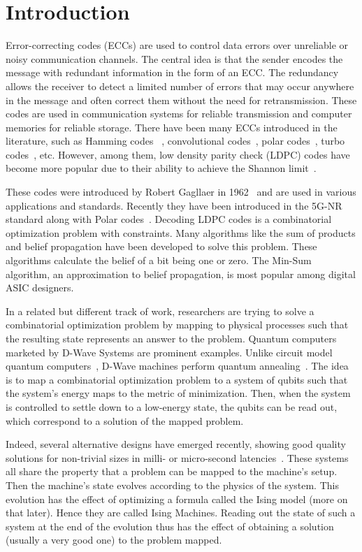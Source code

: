 \section{Introduction}

Error-correcting codes (ECCs) are used to control data errors over unreliable or noisy communication channels. The central idea is that the sender encodes the message with redundant information in the form of an ECC. The redundancy allows the receiver to detect a limited number of errors that may occur anywhere in the message and often correct them without the need for retransmission. These codes are used in communication systems for reliable transmission and computer memories for reliable storage. There have been many ECCs introduced in the literature, such as Hamming codes ~\cite{hamming1950error}, convolutional codes~\cite{viterbi1971convolutional}, polar codes~\cite{arikan2008performance}, turbo codes~\cite{berrou1993near}, etc. However, among them, low density parity check (LDPC) codes have become more popular due to their ability to achieve the Shannon limit~\cite{mackay1999good}. 

These codes were introduced by Robert Gagllaer in 1962~\cite{gallager1962low} and are used in various applications and standards. Recently they have been introduced in the 5G-NR standard along with Polar codes~\cite{bae2019overview}. Decoding LDPC codes is a combinatorial optimization problem with constraints. Many algorithms like the sum of products and belief propagation have been developed to solve this problem. These algorithms calculate the belief of a bit being one or zero. The Min-Sum algorithm, an approximation to belief propagation, is most popular among digital ASIC designers.

In a related but different track of work, researchers are trying to solve a combinatorial optimization problem by mapping to physical processes such that the resulting state represents an answer to the problem. Quantum computers marketed by D-Wave Systems are prominent examples. Unlike circuit model quantum computers~\cite{google_quantum,pednault2019leveraging}, D-Wave machines perform quantum annealing~\cite{bunyk_2014_tas}. The idea is to map a combinatorial optimization problem to a system of qubits such that the system's energy maps to the metric of minimization. Then, when the system is controlled to settle down to a low-energy state, the qubits can be read out, which correspond to a solution of the mapped problem.

Indeed, several alternative designs have emerged recently, showing good quality solutions for non-trivial sizes in milli- or micro-second latencies~\cite{inagaki2016cim, wang2019oim, carmes_comm2020}. These systems all share the property that a problem can be mapped to the machine's setup. Then the machine's state evolves according to the physics of the system. This evolution has the effect of optimizing a formula called the Ising model (more on that later). 
Hence they are called Ising Machines. Reading out the state of such a system at the end of the evolution thus has the effect of obtaining a solution (usually a very good one) to the problem mapped. 

